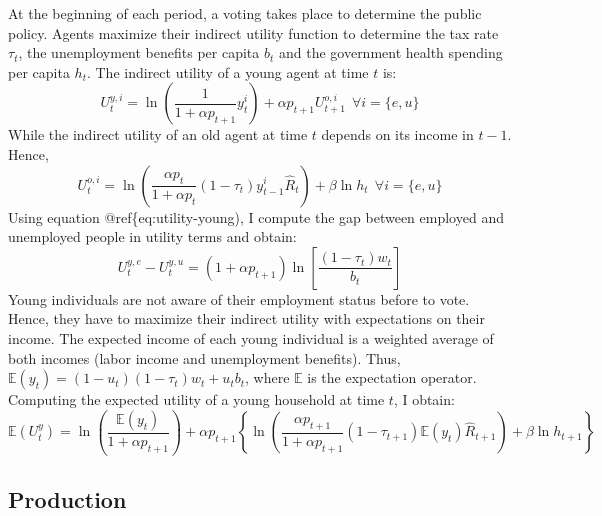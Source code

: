 \documentclass[
]{article}
\begin{document}
At the beginning of each period, a voting takes place to determine the public policy. Agents maximize their indirect utility function to determine the tax rate \(\tau_t\), the unemployment benefits per capita \(b_t\) and the government health spending per capita \(h_t\).
The indirect utility of a young agent at time \(t\) is:
\begin{equation}
    U_t^{y,i} = \ln\left(\frac{1}{1+\alpha p_{t+1}}y_t^i\right)+ \alpha p_{t+1} U_{t+1}^{o,i} ~~ \forall i = \lbrace e,u \rbrace \label{eq:utility-young}
\end{equation}
While the indirect utility of an old agent at time \(t\) depends on its income in \(t-1\). Hence,
\begin{equation}
    U_t^{o,i} = \ln\left(\frac{\alpha p_t}{1+\alpha p_t}(1-\tau_t)y_{t-1}^i\hat{R}_t\right) + \beta \ln h_t ~~ \forall i = \lbrace e,u \rbrace \label{eq:utility-old}
\end{equation}
Using equation @ref\{eq:utility-young), I compute the gap between employed and unemployed people in utility terms and obtain:
\begin{equation}
    U_t^{y,e} - U_t^{y,u} = (1+\alpha p_{t+1})\ln\left[\frac{(1-\tau_t)w_t}{b_t}\right] \label{eq:utility-young-gap}
\end{equation}
Young individuals are not aware of their employment status before to vote. Hence, they have to maximize their indirect utility with expectations on their income. The expected income of each young individual is a weighted average of both incomes (labor income and unemployment benefits). Thus, \(\mathbb{E}(y_t) = (1-u_t)(1-\tau_t)w_t + u_tb_t\), where \(\mathbb{E}\) is the expectation operator. Computing the expected utility of a young household at time \(t\), I obtain:
\begin{equation}
    \mathbb{E}({U}_t^y) = \ln\left(\frac{\mathbb{E}\left(y_t\right)}{1+\alpha p_{t+1}}\right) + \alpha p_{t+1}\left\lbrace \ln\left(\frac{\alpha p_{t+1}}{1+\alpha p_{t+1}}(1-\tau_{t+1})\mathbb{E}(y_t)\hat{R}_{t+1}\right) + \beta \ln h_{t+1} \right\rbrace \label{eq:expected-utility-young}
\end{equation}

\hypertarget{production}{%
\subsection{Production}\label{production}}
\end{document}
